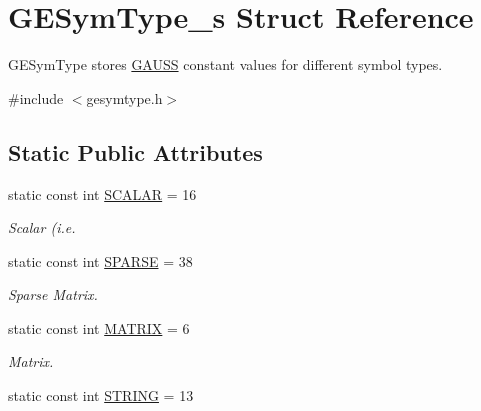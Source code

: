\hypertarget{struct_g_e_sym_type__s}{\section{G\-E\-Sym\-Type\-\_\-s Struct Reference}
\label{struct_g_e_sym_type__s}
}


G\-E\-Sym\-Type stores \hyperlink{class_g_a_u_s_s}{G\-A\-U\-S\-S} constant values for different symbol types.  




{\ttfamily \#include $<$gesymtype.\-h$>$}

\subsection*{Static Public Attributes}
\begin{DoxyCompactItemize}
\item 
static const int \hyperlink{struct_g_e_sym_type__s_a4868e0d2833270b164c4a78b497f4fdc}{S\-C\-A\-L\-A\-R} = 16
\begin{DoxyCompactList}\small\item\em Scalar (i.\-e. \end{DoxyCompactList}\item 
\hypertarget{struct_g_e_sym_type__s_a17bff9bfcefd9f4c639d20d256f20a7d}{static const int \hyperlink{struct_g_e_sym_type__s_a17bff9bfcefd9f4c639d20d256f20a7d}{S\-P\-A\-R\-S\-E} = 38}\label{struct_g_e_sym_type__s_a17bff9bfcefd9f4c639d20d256f20a7d}

\begin{DoxyCompactList}\small\item\em Sparse Matrix. \end{DoxyCompactList}\item 
\hypertarget{struct_g_e_sym_type__s_a3874c4c2df1ed454c13722031e582f66}{static const int \hyperlink{struct_g_e_sym_type__s_a3874c4c2df1ed454c13722031e582f66}{M\-A\-T\-R\-I\-X} = 6}\label{struct_g_e_sym_type__s_a3874c4c2df1ed454c13722031e582f66}

\begin{DoxyCompactList}\small\item\em Matrix. \end{DoxyCompactList}\item 
\hypertarget{struct_g_e_sym_type__s_a0e719c96f22a8453e460f7d87a09696a}{static const int \hyperlink{struct_g_e_sym_type__s_a0e719c96f22a8453e460f7d87a09696a}{S\-T\-R\-I\-N\-G} = 13}\label{struct_g_e_sym_type__s_a0e719c96f22a8453e460f7d87a09696a}


\end{DoxyCompactItemize}
